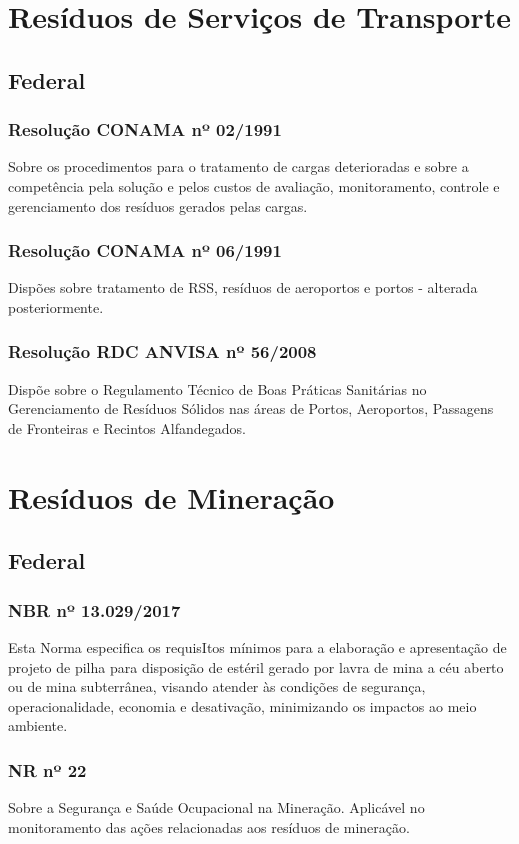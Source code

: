 \section{Resíduos de Serviços de Transporte}
\begin{subapend}
	\subsection{Federal}
	\begin{subsubapend}
		\item \subsubsection{Resolução CONAMA nº 02/1991}
		Sobre os procedimentos para o tratamento de cargas deterioradas e sobre a competência pela solução e pelos custos de avaliação, monitoramento, controle e gerenciamento dos resíduos gerados pelas cargas.
		\subsubsection{Resolução CONAMA nº 06/1991}
		Dispões sobre tratamento de RSS, resíduos de aeroportos e portos - alterada posteriormente.
		\subsubsection{Resolução RDC ANVISA nº 56/2008}
		Dispõe sobre o Regulamento Técnico de Boas Práticas Sanitárias no Gerenciamento de Resíduos Sólidos nas áreas de Portos, Aeroportos, Passagens de Fronteiras e Re­cintos Alfandegados.
	\end{subsubapend}
\end{subapend}

\section{Resíduos de Mineração}

\begin{subapend}
	\subsection{Federal}
	\begin{subsubapend}
		\item \subsubsection{NBR nº 13.029/2017}
		Esta Norma especifica os requisItos mínimos para a elaboração e apresentação de projeto de pilha para disposição de estéril gerado por lavra de mina a céu aberto ou de mina subterrânea, visando atender às condições de segurança, operacionalidade, economia e desativação, minimizando os impactos ao meio ambiente.
		\subsubsection{NR nº 22}
		Sobre a Segurança e Saúde Ocupacional na Mineração. Aplicável no monitoramento das ações relacionadas aos resíduos de mineração.
	\end{subsubapend}
\end{subapend}



